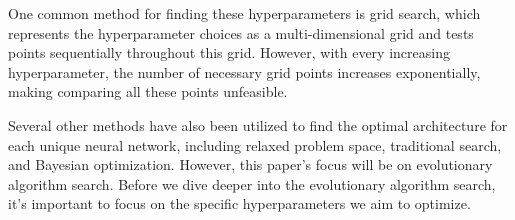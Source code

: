One common method for finding these hyperparameters is grid search, which represents the hyperparameter choices as a multi-dimensional grid and tests points sequentially throughout this grid. However, with every increasing hyperparameter, the number of necessary grid points increases exponentially, making comparing all these points unfeasible. 

Several other methods have also been utilized to find the optimal architecture for each unique neural network, including relaxed problem space, traditional search, and Bayesian optimization. However, this paper's focus will be on evolutionary algorithm search. Before we dive deeper into the evolutionary algorithm search, it's important to focus on the specific hyperparameters we aim to optimize. 




